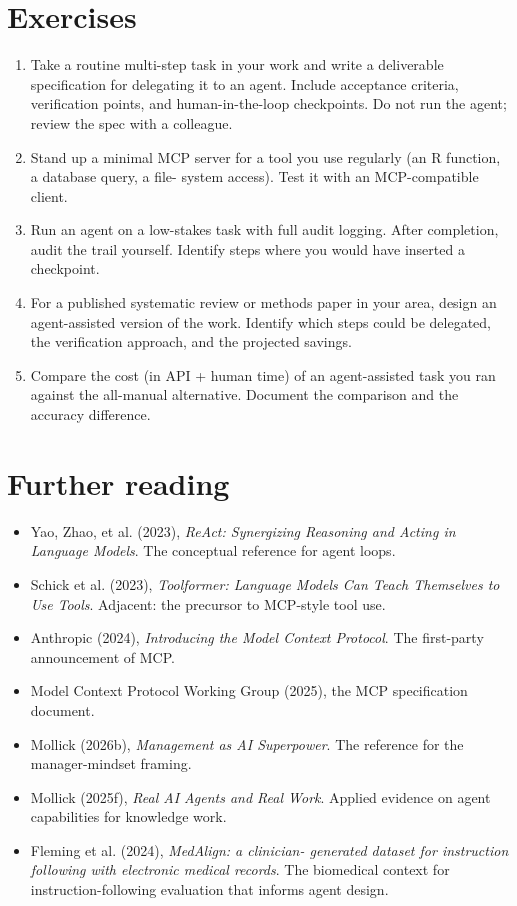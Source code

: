 \documentclass[
  letterpaper,
  11pt]{scrbook}
\providecommand{\tightlist}{%
  \setlength{\itemsep}{0pt}\setlength{\parskip}{0pt}}
\begin{document}
\section{Exercises}\label{exercises-7}

\begin{enumerate}
\def\labelenumi{\arabic{enumi}.}
\item
  Take a routine multi-step task in your work and write a deliverable
  specification for delegating it to an agent. Include acceptance
  criteria, verification points, and human-in-the-loop checkpoints. Do
  not run the agent; review the spec with a colleague.
\item
  Stand up a minimal MCP server for a tool you use regularly (an R
  function, a database query, a file- system access). Test it with an
  MCP-compatible client.
\item
  Run an agent on a low-stakes task with full audit logging. After
  completion, audit the trail yourself. Identify steps where you would
  have inserted a checkpoint.
\item
  For a published systematic review or methods paper in your area,
  design an agent-assisted version of the work. Identify which steps
  could be delegated, the verification approach, and the projected
  savings.
\item
  Compare the cost (in API + human time) of an agent-assisted task you
  ran against the all-manual alternative. Document the comparison and
  the accuracy difference.
\end{enumerate}

\section{Further reading}\label{further-reading-7}

\begin{itemize}
\tightlist
\item
  Yao, Zhao, et al. (2023), \emph{ReAct: Synergizing Reasoning and
  Acting in Language Models}. The conceptual reference for agent loops.
\item
  Schick et al. (2023), \emph{Toolformer: Language Models Can Teach
  Themselves to Use Tools}. Adjacent: the precursor to MCP-style tool
  use.
\item
  Anthropic (2024), \emph{Introducing the Model Context Protocol}. The
  first-party announcement of MCP.
\item
  Model Context Protocol Working Group (2025), the MCP specification
  document.
\item
  Mollick (2026b), \emph{Management as AI Superpower}. The reference for
  the manager-mindset framing.
\item
  Mollick (2025f), \emph{Real AI Agents and Real Work}. Applied evidence
  on agent capabilities for knowledge work.
\item
  Fleming et al. (2024), \emph{MedAlign: a clinician- generated dataset
  for instruction following with electronic medical records}. The
  biomedical context for instruction-following evaluation that informs
  agent design.
\end{itemize}
\end{document}

